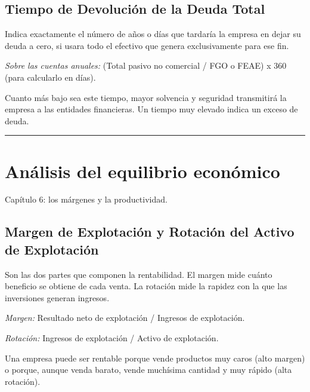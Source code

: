\documentclass[12pt]{book} %
\begin{document}
\hypertarget{tiempo-de-devoluciuxf3n-de-la-deuda-total}{%
\subsection{Tiempo de Devolución de la Deuda
Total}\label{tiempo-de-devoluciuxf3n-de-la-deuda-total}}

Indica exactamente el número de años o días que tardaría la empresa en
dejar su deuda a cero, si usara todo el efectivo que genera
exclusivamente para ese fin.

\emph{Sobre las cuentas anuales:} (Total pasivo no comercial / FGO o
FEAE) x 360 (para calcularlo en días).

Cuanto más bajo sea este tiempo, mayor solvencia y seguridad transmitirá
la empresa a las entidades financieras. Un tiempo muy elevado indica un
exceso de deuda.

\begin{center}\rule{0.5\linewidth}{0.5pt}\end{center}

\hypertarget{anuxe1lisis-del-equilibrio-econuxf3mico}{%
\section{Análisis del equilibrio
económico}\label{anuxe1lisis-del-equilibrio-econuxf3mico}}

Capítulo 6: los márgenes y la productividad.

\hypertarget{margen-de-explotaciuxf3n-y-rotaciuxf3n-del-activo-de-explotaciuxf3n}{%
\subsection{Margen de Explotación y Rotación del Activo de
Explotación}\label{margen-de-explotaciuxf3n-y-rotaciuxf3n-del-activo-de-explotaciuxf3n}}

Son las dos partes que componen la rentabilidad. El margen mide cuánto
beneficio se obtiene de cada venta. La rotación mide la rapidez con la
que las inversiones generan ingresos.

\emph{Margen:} Resultado neto de explotación / Ingresos de explotación.

\emph{Rotación:} Ingresos de explotación / Activo de explotación.

Una empresa puede ser rentable porque vende productos muy caros (alto
margen) o porque, aunque venda barato, vende muchísima cantidad y muy
rápido (alta rotación).
\end{document}
